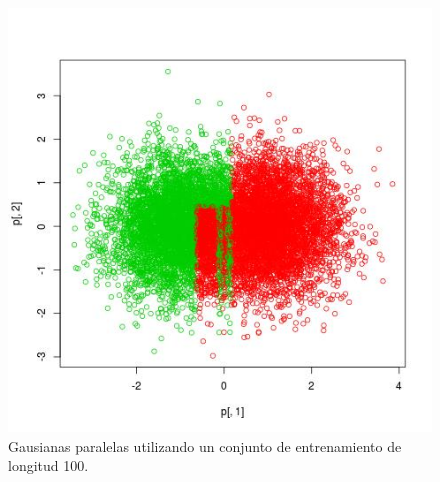 \documentclass[12pt, a4paper]{article}
\begin{document}
\begin{figure}
    \centering
	\includegraphics[scale=0.50]{gausianasB5}
	\caption{Gausianas paralelas utilizando un conjunto de entrenamiento de longitud 100.}


    \centering


\end{figure}
\end{document}
